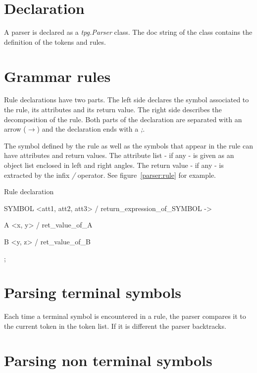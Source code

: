 \section{Declaration}

A parser is declared as a \emph{tpg.Parser} class.
The doc string of the class contains the definition of the tokens and rules.

\section{Grammar rules}                                         \label{parser:grammar_rules}

Rule declarations have two parts.
The left side declares the symbol associated to the rule, its attributes and its return value.
The right side describes the decomposition of the rule.
Both parts of the declaration are separated with an arrow (\emph{$\to$})
and the declaration ends with a \emph{;}.

The symbol defined by the rule as well as the symbols that appear in the rule can have attributes and return values.
The attribute list - if any - is given as an object list enclosed in left and right angles.
The return value - if any - is extracted by the infix \emph{/} operator.
See figure~\ref{parser:rule} for example.

\begin{code}
\caption{Rule declaration}                                      \label{parser:rule}
\begin{verbatimtab}[4]
    SYMBOL <att1, att2, att3> / return_expression_of_SYMBOL ->

        A <x, y> / ret_value_of_A

        B <y, z> / ret_value_of_B

        ;
\end{verbatimtab}
\end{code}

\section{Parsing terminal symbols}

Each time a terminal symbol is encountered in a rule, the parser compares it to the current token in the token list. If it is different the parser backtracks.

\section{Parsing non terminal symbols}                          \label{parser:nterm}

